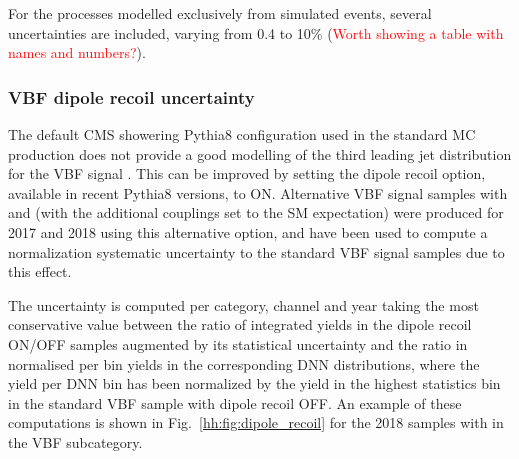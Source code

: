 \documentclass[../main.tex]{subfiles}
\begin{document}
For the processes modelled exclusively from simulated events, several uncertainties are included, varying from 0.4 to 10\% (\textcolor{red}{Worth showing a table with names and numbers?}).


\subsubsection*{VBF dipole recoil uncertainty}

The default CMS showering Pythia8 configuration used in the standard MC production does not provide a good modelling of the third leading jet distribution for the VBF signal \cite{hh:results:dipole_recoil}. This can be improved by setting the dipole recoil option, available in recent Pythia8 versions, to ON. Alternative VBF signal samples with  and  (with the additional couplings set to the SM expectation) were produced for 2017 and 2018 using this alternative option, and have been used to compute a normalization systematic uncertainty to the standard VBF signal samples due to this effect.

The uncertainty is computed per category, channel and year taking the most conservative value between the ratio of integrated yields in the dipole recoil ON/OFF samples augmented by its statistical uncertainty and the ratio in normalised per bin yields in the corresponding DNN distributions, where the yield per DNN bin has been normalized by the yield in the highest statistics bin in the standard VBF sample with dipole recoil OFF. An example of these computations is shown in Fig.~\ref{hh:fig:dipole_recoil} for the 2018 samples with  in the VBF subcategory.
\end{document}
